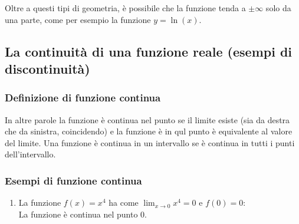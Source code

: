 \documentclass{article}
\begin{document}

Oltre a questi tipi di geometria, è possibile che la funzione tenda a \(\pm\infty\)
solo da una parte, come per esempio la funzione \(y=\ln(x)\).

\newpage

\subsection{La continuità di una funzione reale (esempi di discontinuità)}

\subsubsection{Definizione di funzione continua}


In altre parole la funzione è continua nel punto se il limite esiste (sia da destra che da sinistra, coincidendo)
e la funzione è in qul punto è equivalente al valore del limite.
Una funzione è continua in un intervallo se è continua in tutti i punti dell'intervallo.

\subsubsection{Esempi di funzione continua}
\begin{enumerate}
    \item La funzione \(f(x)=x^4\) ha come \(\lim_{x \to 0} x^4=0\) e \(f(0)=0\):\\
    \textrightarrow La funzione è continua nel punto 0.
\end{enumerate}
\end{document}

